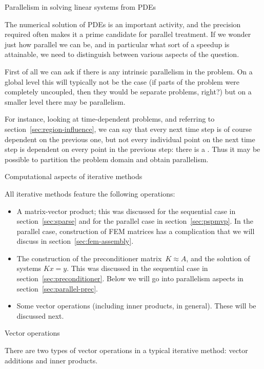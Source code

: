 \begin{notready}
 {Parallelism in solving linear systems from \acp{PDE}}

The numerical solution of \acp{PDE} is an important activity,
and the precision required often makes it a prime candidate for
parallel treatment. If we wonder just how parallel we can be,
and in particular what sort of a speedup is attainable,
we need to distinguish between various aspects of the question.

First of all we can ask if there is any intrinsic parallelism
in the problem. On a global level this will typically not be the case
(if parts of the problem were completely uncoupled, then they would be
separate problems, right?) but on a smaller level there may be
parallelism. 

For instance, looking at time-dependent problems, and referring to
section~\ref{sec:region-influence}, we can say that every next time
step is of course dependent on the previous one, but not every
individual point on the next time step is dependent on every point in
the previous step: there is a . 
Thus it may be possible to partition the problem domain and
obtain parallelism.
\end{notready}


 {Computational aspects of iterative methods}
\label{sec:iterative-computational}

All iterative methods feature the following operations:
\begin{itemize}
\item A matrix-vector product; this was discussed for the sequential
  case in section~\ref{sec:sparse} and for the parallel case in
  section~\ref{sec:pspmvp}.
  In the parallel case,
  construction of \ac{FEM} matrices has a complication that we will
  discuss in section~\ref{sec:fem-assembly}.
\item The construction of the preconditioner matrix~$K\approx A$, and
  the solution of systems $Kx=y$. This was discussed in the sequential
  case in section~\ref{sec:preconditioner}. Below
  we will go into parallelism aspects in section~\ref{sec:parallel-prec}.
\item Some vector operations (including inner products, in
  general). These will be discussed next.
\end{itemize}

 {Vector operations}

There are two types of vector operations in a typical iterative method:
vector additions and inner products. 

